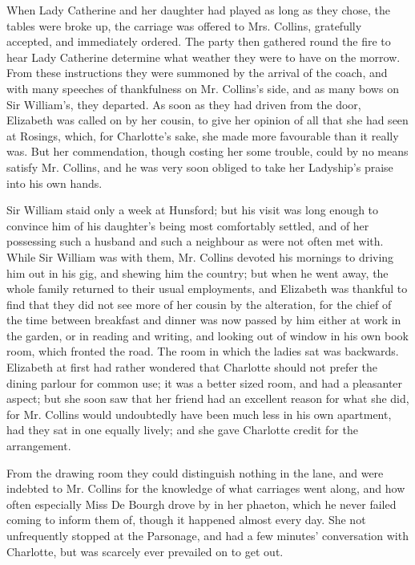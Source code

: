 When Lady Catherine and her daughter had played as
long as they chose, the tables were broke up, the carriage
was offered to Mrs. Collins, gratefully accepted, and
immediately ordered. The party then gathered round the
fire to hear Lady Catherine determine what weather they
were to have on the morrow. From these instructions
they were summoned by the arrival of the coach, and
with many speeches of thankfulness on Mr. Collins’s side,
and as many bows on Sir William’s, they departed. As
soon as they had driven from the door, Elizabeth was
called on by her cousin, to give her opinion of all that she
had seen at Rosings, which, for Charlotte’s sake, she made
more favourable than it really was. But her commendation,
though costing her some trouble, could by no means
satisfy Mr. Collins, and he was very soon obliged to take
her Ladyship’s praise into his own hands.


Sir William staid only a week at Hunsford; but his
visit was long enough to convince him of his daughter’s
being most comfortably settled, and of her possessing such
a husband and such a neighbour as were not often met
with. While Sir William was with them, Mr. Collins
devoted his mornings to driving him out in his gig, and
shewing him the country; but when he went away, the
whole family returned to their usual employments, and
Elizabeth was thankful to find that they did not see more
of her cousin by the alteration, for the chief of the time
between breakfast and dinner was now passed by him
either at work in the garden, or in reading and writing, and
looking out of window in his own book room, which fronted
the road. The room in which the ladies sat was backwards.
Elizabeth at first had rather wondered that Charlotte should
not prefer the dining parlour for common use; it was
a better sized room, and had a pleasanter aspect; but
she soon saw that her friend had an excellent reason for
what she did, for Mr. Collins would undoubtedly have been
much less in his own apartment, had they sat in one
equally lively; and she gave Charlotte credit for the
arrangement.

From the drawing room they could distinguish nothing
in the lane, and were indebted to Mr. Collins for the
knowledge of what carriages went along, and how often
especially Miss De Bourgh drove by in her phaeton, which
he never failed coming to inform them of, though it happened
almost every day. She not unfrequently stopped
at the Parsonage, and had a few minutes’ conversation
with Charlotte, but was scarcely ever prevailed on to
get out.

